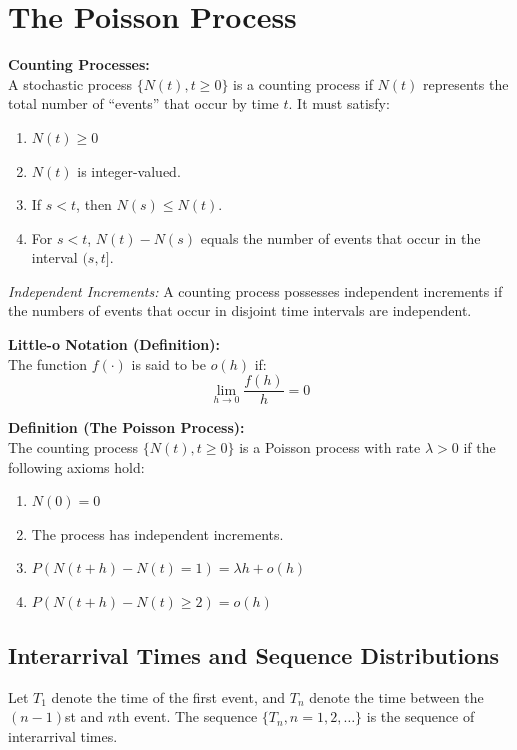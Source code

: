 \section{\textcolor{primary}{The Poisson Process}}
\textbf{\textcolor{secondary}{Counting Processes:}} \\
A stochastic process $\{N(t), t \ge 0\}$ is a counting process if $N(t)$ represents the total number of ``events'' that occur by time $t$. It must satisfy:
\begin{enumerate}
    \item $N(t) \ge 0$
    \item $N(t)$ is integer-valued.
    \item If $s < t$, then $N(s) \le N(t)$.
    \item For $s < t$, $N(t) - N(s)$ equals the number of events that occur in the interval $(s, t]$.
\end{enumerate}

\textit{Independent Increments:} A counting process possesses independent increments if the numbers of events that occur in disjoint time intervals are independent. 

\vspace{0.5cm}

\textbf{\textcolor{secondary}{Little-o Notation (Definition):}} \\
The function $f(\cdot)$ is said to be $o(h)$ if:
\[ \lim_{h \to 0} \frac{f(h)}{h} = 0 \]

\textbf{\textcolor{secondary}{Definition (The Poisson Process):}} \\
The counting process $\{N(t), t \ge 0\}$ is a Poisson process with rate $\lambda > 0$ if the following axioms hold:
\begin{enumerate}
    \item $N(0) = 0$
    \item The process has independent increments.
    \item $P(N(t+h) - N(t) = 1) = \lambda h + o(h)$
    \item $P(N(t+h) - N(t) \ge 2) = o(h)$
\end{enumerate}

\vspace{0.5cm}

\subsection{\textcolor{secondary}{Interarrival Times and Sequence Distributions}}
Let $T_1$ denote the time of the first event, and $T_n$ denote the time between the $(n-1)$st and $n$th event. The sequence $\{T_n, n=1, 2, \dots\}$ is the sequence of interarrival times.

